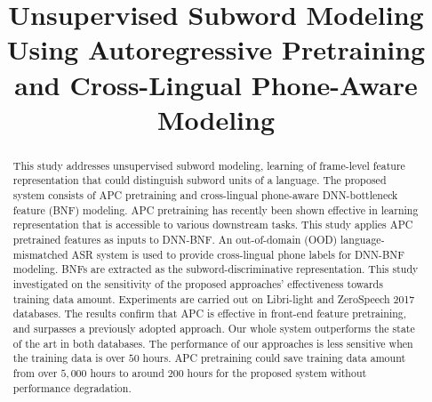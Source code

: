 \documentclass[a4paper]{article}
\title{Unsupervised Subword Modeling Using Autoregressive Pretraining and Cross-Lingual Phone-Aware Modeling}
\begin{document}
\maketitle
% 
\begin{abstract}
This study addresses unsupervised subword modeling, learning of frame-level feature representation that could distinguish subword units of a language. 
The proposed system consists of APC pretraining  and cross-lingual phone-aware DNN-bottleneck feature (BNF) modeling. APC pretraining has recently been shown effective in learning representation that is accessible to various downstream tasks. This study applies APC pretrained features as inputs to DNN-BNF. An out-of-domain (OOD) language-mismatched  ASR system is used to provide cross-lingual phone labels for DNN-BNF modeling. BNFs are extracted as the subword-discriminative  representation. This study investigated on the sensitivity of the proposed approaches' effectiveness towards training data amount. Experiments are carried out on Libri-light and ZeroSpeech 2017 databases. The results confirm that  APC  is effective in front-end feature pretraining, and surpasses a previously adopted approach. 
Our whole system outperforms the state of the art in both databases. 
The performance of our  approaches   is less sensitive when the training data is over $50$ hours.  
APC pretraining could save training data amount from over $5,000$ hours to around $200$ hours for the proposed system without performance degradation.  



\end{abstract}
\end{document}
